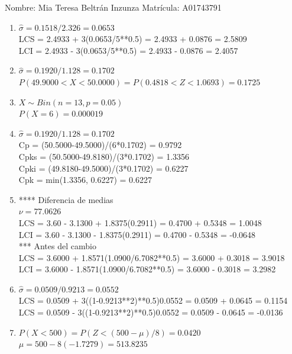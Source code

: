 \documentclass[8pt]{report}
\begin{document}
 \newpage

Nombre: \underline{\hspace*{.2in}}
Mia Teresa Beltrán Inzunza
\underline{\hspace*{.2in}} \quad Matr\'icula:\underline{\hspace*{.2in}}
A01743791
\underline{\hspace*{.2in}} \\

\begin{enumerate}
\item $\hat\sigma = 0.1518/2.326 = 0.0653$\\
LCS = 2.4933 + 3(0.0653/5**0.5) = 2.4933 + 0.0876 = 2.5809\\
LCI = 2.4933 - 3(0.0653/5**0.5) = 2.4933 - 0.0876 = 2.4057
\item $\hat\sigma = 0.1920/1.128 = 0.1702$\\
$P(49.9000 < X < 50.0000) = P(0.4818 < Z < 1.0693) = 0.1725$\\
\item $X \sim Bin(n=13, p=0.05)$\\
$P(X = 6) = 0.000019$
\item $\hat\sigma = 0.1920/1.128 = 0.1702$\\
Cp = (50.5000-49.5000)/(6*0.1702) = 0.9792\\
Cpks = (50.5000-49.8180)/(3*0.1702) = 1.3356\\
Cpki = (49.8180-49.5000)/(3*0.1702) = 0.6227\\
Cpk = min(1.3356, 0.6227) = 0.6227
\item **** Diferencia de medias\\
$\nu = 77.0626$\\
LCS = 3.60 - 3.1300 + 1.8375(0.2911) = 0.4700 + 0.5348 = 1.0048\\
LCI = 3.60 - 3.1300 - 1.8375(0.2911) = 0.4700 - 0.5348 = -0.0648\\
*** Antes del cambio\\
LCS = 3.6000 + 1.8571(1.0900/6.7082**0.5) = 3.6000 + 0.3018 = 3.9018\\
LCI = 3.6000 - 1.8571(1.0900/6.7082**0.5) = 3.6000 - 0.3018 = 3.2982\\
\item $\hat\sigma = 0.0509/0.9213 = 0.0552$\\
LCS = 0.0509 + 3((1-0.9213**2)**0.5)0.0552 = 0.0509 + 0.0645 = 0.1154\\
LCS = 0.0509 - 3((1-0.9213**2)**0.5)0.0552 = 0.0509 - 0.0645 = -0.0136
\item $P(X < 500) = P(Z < (500-\mu)/8) = 0.0420$\\
$\mu = 500 - 8(-1.7279) = 513.8235$\\
\end{enumerate}
\end{document}
